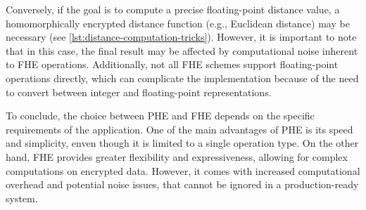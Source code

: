Conversely, if the goal is to compute a precise floating-point distance value, a homomorphically encrypted distance function (e.g., Euclidean distance) may be necessary (see \cref{lst:distance-computation-tricks}). However, it is important to note that in this case, the final result may be affected by computational noise inherent to FHE operations. Additionally, not all FHE schemes support floating-point operations directly, which can complicate the implementation because of the need to convert between integer and floating-point representations.

To conclude, the choice between PHE and FHE depends on the specific requirements of the application. One of the main advantages of PHE is its speed and simplicity, enven though it is limited to a single operation type. On the other hand, FHE provides greater flexibility and expressiveness, allowing for complex computations on encrypted data. However, it comes with increased computational overhead and potential noise issues, that cannot be ignored in a production-ready system.

